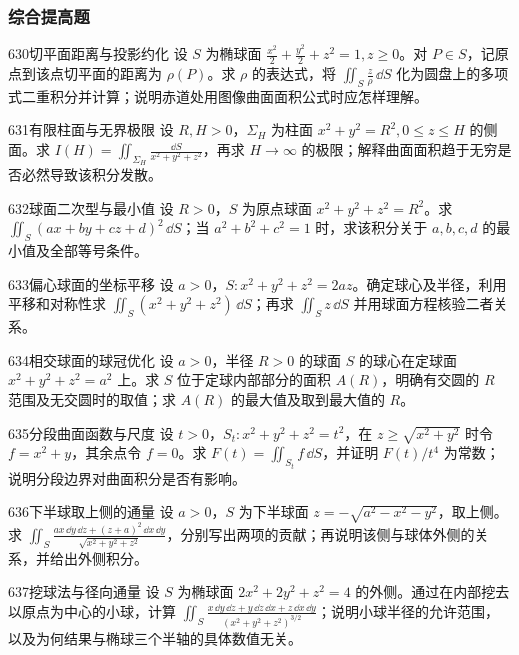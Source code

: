 \subsubsection{综合提高题}
\begin{exercise}{630}{切平面距离与投影约化}
设 $S$ 为椭球面 $\frac{x^2}2+\frac{y^2}2+z^2=1,z\ge0$。对 $P\in S$，记原点到该点切平面的距离为 $\rho(P)$。求 $\rho$ 的表达式，将 $\iint_S\frac z\rho\,\dd S$ 化为圆盘上的多项式二重积分并计算；说明赤道处用图像曲面面积公式时应怎样理解。
\end{exercise}
\begin{exercise}{631}{有限柱面与无界极限}
设 $R,H>0$，$\Sigma_H$ 为柱面 $x^2+y^2=R^2,0\le z\le H$ 的侧面。求 $I(H)=\iint_{\Sigma_H}\frac{\dd S}{x^2+y^2+z^2}$，再求 $H\to\infty$ 的极限；解释曲面面积趋于无穷是否必然导致该积分发散。
\end{exercise}
\begin{exercise}{632}{球面二次型与最小值}
设 $R>0$，$S$ 为原点球面 $x^2+y^2+z^2=R^2$。求 $\iint_S(ax+by+cz+d)^2\,\dd S$；当 $a^2+b^2+c^2=1$ 时，求该积分关于 $a,b,c,d$ 的最小值及全部等号条件。
\end{exercise}
\begin{exercise}{633}{偏心球面的坐标平移}
设 $a>0$，$S:x^2+y^2+z^2=2az$。确定球心及半径，利用平移和对称性求 $\iint_S(x^2+y^2+z^2)\,\dd S$；再求 $\iint_Sz\,\dd S$ 并用球面方程核验二者关系。
\end{exercise}
\begin{exercise}{634}{相交球面的球冠优化}
设 $a>0$，半径 $R>0$ 的球面 $S$ 的球心在定球面 $x^2+y^2+z^2=a^2$ 上。求 $S$ 位于定球内部部分的面积 $A(R)$，明确有交圆的 $R$ 范围及无交圆时的取值；求 $A(R)$ 的最大值及取到最大值的 $R$。
\end{exercise}
\begin{exercise}{635}{分段曲面函数与尺度}
设 $t>0$，$S_t:x^2+y^2+z^2=t^2$，在 $z\ge\sqrt{x^2+y^2}$ 时令 $f=x^2+y$，其余点令 $f=0$。求 $F(t)=\iint_{S_t}f\,\dd S$，并证明 $F(t)/t^4$ 为常数；说明分段边界对曲面积分是否有影响。
\end{exercise}
\begin{exercise}{636}{下半球取上侧的通量}
设 $a>0$，$S$ 为下半球面 $z=-\sqrt{a^2-x^2-y^2}$，取上侧。求 $\iint_S\frac{ax\,\dd y\,\dd z+(z+a)^2\,\dd x\,\dd y}{\sqrt{x^2+y^2+z^2}}$，分别写出两项的贡献；再说明该侧与球体外侧的关系，并给出外侧积分。
\end{exercise}
\begin{exercise}{637}{挖球法与径向通量}
设 $S$ 为椭球面 $2x^2+2y^2+z^2=4$ 的外侧。通过在内部挖去以原点为中心的小球，计算 $\iint_S\frac{x\,\dd y\,\dd z+y\,\dd z\,\dd x+z\,\dd x\,\dd y}{(x^2+y^2+z^2)^{3/2}}$；说明小球半径的允许范围，以及为何结果与椭球三个半轴的具体数值无关。
\end{exercise}
